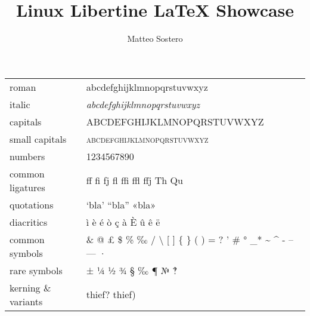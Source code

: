 \documentclass[11pt,a4paper]{article}
\author{Matteo Sostero}
\title{Linux Libertine \LaTeX{} Showcase}
\begin{document}
\maketitle

\centering

\begin{tabular}{ll}
\toprule
roman               & abcdefghijklmnopqrstuvwxyz                                                          \\
italic              & \emph{abcdefghijklmnopqrstuvwxyz}                                                   \\
capitals            & \uppercase{abcdefghijklmnopqrstuvwxyz}                                              \\
small capitals      & \textsc{abcdefghijklmnopqrstuvwxyz}                                                 \\
numbers             & 1234567890                                                                          \\
common ligatures    & ff fi fj fl ffi ffl ffj Th Qu                                                       \\
quotations          & ‘bla’ “bla” «bla»                                                                   \\
diacritics          & ì è é ò ç à È û ê ë                                                                 \\
common symbols      & \& @ £ \$ \% ‰ / \textbackslash{} [ ] \{ \} ( ) = ? ' \# ° \_* \~{} \^{} - -- --- · \\
rare symbols        & ± ¼ ½ ¾ § ‰ ¶ № ‽                                                                   \\
kerning \& variants & thief? thief)                                                                       \\
\bottomrule
\end{tabular}

\vfill
\end{document}
